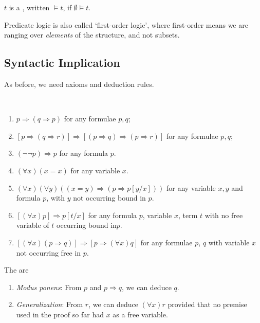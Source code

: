 \documentclass[a4paper, 10pt, twocolumn]{amsart}
\newcommand{\enumpre}{\vspace{-1.5\baselineskip}}
\begin{document}
\begin{definition}[Tautology]
  $t$ is a , written $\models t$, if $\emptyset \models t$.
\end{definition}

Predicate logic is also called `first-order logic', where first-order means we are ranging over \emph{elements} of the structure, and not subsets.

\subsection{Syntactic Implication}

As before, we need axioms and deduction rules.

\begin{definition}~
  \enumpre
  \begin{enumerate}
    \item $p \Rightarrow (q \Rightarrow p)$ for any formulae $p, q $;
    \item $[p \Rightarrow (q \Rightarrow r)] \Rightarrow [(p \Rightarrow q) \Rightarrow (p \Rightarrow r)]$ for any formulae $p, q$;
    \item $(\lnot \lnot p) \Rightarrow p$ for any formula $p$.
    \item $(\forall x)(x = x)$ for any variable $x$.
    \item $(\forall x)(\forall y)((x = y) \Rightarrow (p \Rightarrow p[y/x]))$ for any variable $x, y$ and formula $p$, with $y$ not occurring bound in $p$.
    \item $[(\forall x)p] \Rightarrow p[t/x]$ for any formula $p$, variable $x$, term $t$ with no free variable of $t$ occurring bound in$p$.
    \item $[(\forall x)(p\Rightarrow q)] \Rightarrow [p\Rightarrow(\forall x)q]$ for any formulae $p$, $q$ with variable $x$ not occurring free in $p$.
  \end{enumerate}
\end{definition}

\begin{definition}
  The  are 
  \begin{enumerate}
    \item \emph{Modus ponens}: From $p$ and $p \Rightarrow q$, we can deduce $q$.
    \item \emph{Generalization}: From $r$, we can deduce $(\forall x)r$ provided that no premise used in the proof so far had $x$ as a free variable.
  \end{enumerate}
\end{definition}
\end{document}
